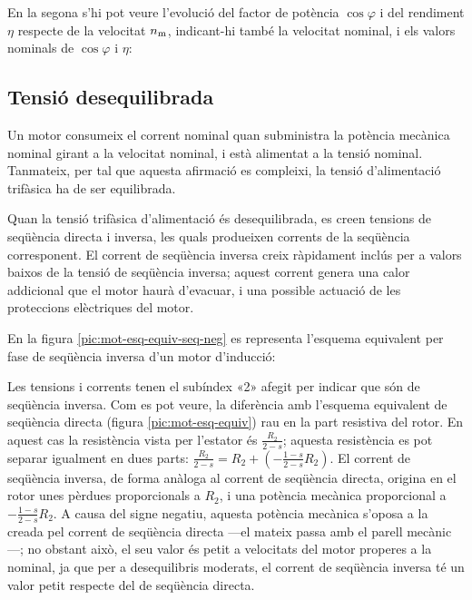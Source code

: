 \begin{exemple}
	En la segona s'hi pot veure l'evolució del factor de potència $\cos\varphi$ i del rendiment $\eta$ respecte de la velocitat $n_\mathrm{m}$, indicant-hi també la  velocitat nominal, i els valors nominals de $\cos\varphi$ i $\eta$:
	\vspace{-3mm}
	\begin{center}
	\fontsize{10pt}{11pt}\selectfont
	
	\end{center}	

\end{exemple}

\subsection{Tensió desequilibrada}\label{sec:mot-tens-deseq}

Un motor consumeix el corrent nominal quan subministra la potència mecànica nominal girant a la velocitat nominal, i està alimentat a la tensió nominal. Tanmateix, per tal que aquesta afirmació es compleixi, la tensió d'alimentació trifàsica ha de ser equilibrada.

Quan la tensió trifàsica d'alimentació és desequilibrada, es creen tensions de seqüència directa i inversa, les quals  produeixen corrents de la seqüència corresponent. El corrent de seqüència inversa creix ràpidament inclús per a valors baixos de  la tensió de seqüència inversa; aquest corrent genera una calor addicional que el motor haurà d'evacuar, i una possible actuació de les proteccions elèctriques del motor.

En la figura \vref{pic:mot-esq-equiv-seq-neg} es representa l'esquema equivalent per fase de seqüència inversa d'un   motor d'inducció:
\vspace{-2mm}
\begin{center}
	
	\label{pic:mot-esq-equiv-seq-neg}
\end{center}

Les tensions i corrents tenen el subíndex «2» afegit per indicar que són de seqüència inversa. Com es pot veure, la diferència amb l'esquema equivalent de seqüència directa (figura \vref{pic:mot-esq-equiv}) rau en la part resistiva del rotor. En aquest cas la resistència vista per l'estator és $\frac{R_2}{2-s}$; aquesta resistència es pot separar igualment en dues parts: $\frac{R_2}{2-s} = R_2 + \left(-\frac{1-s}{2-s} R_2\right)$. El corrent de seqüència inversa, de forma anàloga al corrent de seqüència directa,  origina en el rotor unes pèrdues proporcionals a  $R_2$, i una potència mecànica proporcional a $- \frac{1-s}{2-s} R_2$. A causa del signe negatiu, aquesta potència mecànica  s'oposa a la  creada pel corrent de seqüència directa ---el mateix passa amb el parell mecànic---; no obstant això, el seu valor és petit a velocitats del motor properes a la nominal, ja que per a desequilibris moderats, el corrent de seqüència inversa té un valor petit respecte del de seqüència directa.

